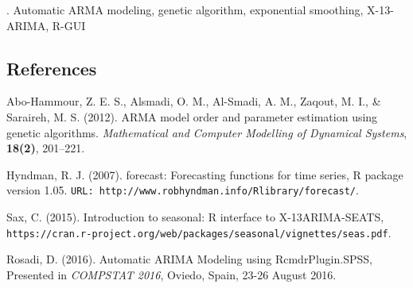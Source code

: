 \documentclass[12pt]{article}
\begin{document}
. Automatic ARMA modeling, genetic algorithm, exponential smoothing, X-13-ARIMA, R-GUI


%        
%
%        

\subsection*{References}

\begin{description}
\item
Abo-Hammour, Z. E. S., Alsmadi, O. M., Al-Smadi, A. M., Zaqout, M. I., \& Saraireh, M. S. (2012). 
ARMA model order and parameter estimation using genetic algorithms. \textit{Mathematical and Computer Modelling of Dynamical Systems}, \textbf{18(2)}, 201--221.

\item Hyndman, R. J. (2007).
forecast: Forecasting functions for time series, R package version 1.05. \texttt{URL: http://www.robhyndman.info/Rlibrary/forecast/}.

\item Sax, C. (2015).
Introduction to seasonal: R interface to X-13ARIMA-SEATS, \\
\texttt{https://cran.r-project.org/web/packages/seasonal/vignettes/seas.pdf}.

\item Rosadi, D. (2016). Automatic ARIMA Modeling using RcmdrPlugin.SPSS, Presented in \textit{COMPSTAT 2016}, Oviedo, Spain, 23-26 August 2016. 
\end{description}
\end{document}
